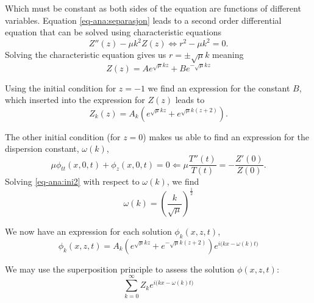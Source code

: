 \documentclass[12pt]{article}
\begin{document}
Which must be constant as both sides of the equation are functions of different variables. Equation \eqref{eq-ana:separasjon}
leads to a second order differential equation that can be solved using characteristic equations
\begin{equation}
Z''(z) - \mu k^2 Z(z) \Longleftrightarrow r^2 - \mu k^2 = 0.
\end{equation}
Solving the characteristic equation gives us $r = \pm \sqrt{\mu}k$ meaning
\begin{equation}
Z(z) = A e^{\sqrt{\mu}k z} + Be^{-\sqrt{\mu}k z}
\end{equation}

Using the initial condition for $z = -1$ we find an expression for the constant $B$, which inserted into the expression for $Z(z)$ leads to
\begin{equation}
Z_k(z) = A_k \left( e^{\sqrt{\mu}kz} + e^{ \sqrt{\mu}k(z+2) } \right).
\end{equation}

The other initial condition (for $z=0$) makes us able to find an expression for the dispersion constant, $\omega(k)$,
\begin{equation}
\mu \phi_{tt}(x,0,t) + \phi_{z}(x,0,t) = 0 \Longleftarrow \mu \frac{T''(t)}{T(t)} = - \frac{Z'(0)}{Z(0)}.
\label{eq-ana:ini2}
\end{equation}
Solving \eqref{eq-ana:ini2} with respect to $\omega(k)$, we find
\begin{equation}
\omega(k) = \left( \frac{k}{\sqrt{\mu}} \right)^{\frac{1}{2}}
\end{equation}

We now have an expression for each solution $\phi_k(x,z,t)$,
\begin{equation}
\phi_k(x,z,t) = A_k \left( e^{\sqrt{\mu}kz} + e^{-\sqrt{\mu}k(z+2)} \right) e^{i\big( kx - \omega(k)t \big)}
\end{equation}

We may use the superposition principle to assess the solution $\phi(x,z,t)$:
\begin{equation}
\sum_{k=0}^{\infty} Z_k e^{i\big(kx - \omega(k) t \big)}
\end{equation}
\end{document}
